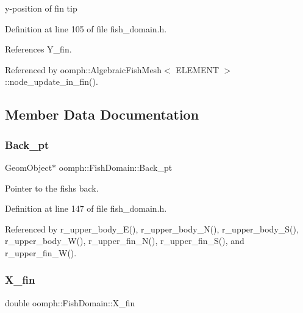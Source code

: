 y-\/position of fin tip 



Definition at line 105 of file fish\+\_\+domain.\+h.



References Y\+\_\+fin.



Referenced by oomph\+::\+Algebraic\+Fish\+Mesh$<$ E\+L\+E\+M\+E\+N\+T $>$\+::node\+\_\+update\+\_\+in\+\_\+fin().



\subsection{Member Data Documentation}
\mbox{\label{classoomph_1_1FishDomain_ae943e7fe48ce09dded2d5351ab980f93}} 
\subsubsection{\texorpdfstring{Back\+\_\+pt}{Back\_pt}}
{\footnotesize\ttfamily Geom\+Object$\ast$ oomph\+::\+Fish\+Domain\+::\+Back\+\_\+pt\hspace{0.3cm}{\ttfamily [private]}}



Pointer to the fish\textquotesingle{}s back. 



Definition at line 147 of file fish\+\_\+domain.\+h.



Referenced by r\+\_\+upper\+\_\+body\+\_\+\+E(), r\+\_\+upper\+\_\+body\+\_\+\+N(), r\+\_\+upper\+\_\+body\+\_\+\+S(), r\+\_\+upper\+\_\+body\+\_\+\+W(), r\+\_\+upper\+\_\+fin\+\_\+\+N(), r\+\_\+upper\+\_\+fin\+\_\+\+S(), and r\+\_\+upper\+\_\+fin\+\_\+\+W().

\mbox{\label{classoomph_1_1FishDomain_af27c51fe0272df3dec2ad93c5c231d59}} 
\subsubsection{\texorpdfstring{X\+\_\+fin}{X\_fin}}
{\footnotesize\ttfamily double oomph\+::\+Fish\+Domain\+::\+X\+\_\+fin\hspace{0.3cm}{\ttfamily [private]}}



